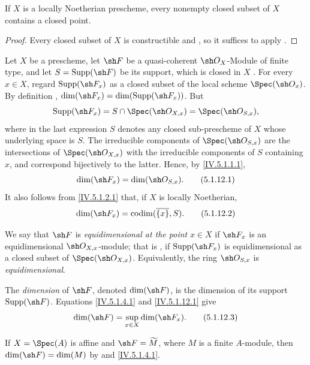 \begin{corollary}[5.1.11]
\label{IV.5.1.11}
If $X$ is a locally Noetherian prescheme, every nonempty closed
subset of $X$ contains a closed point.
\end{corollary}

\begin{proof}
Every closed subset of $X$ is constructible
 and , so it suffices to apply
.
\end{proof}

\begin{env}[5.1.12]
\label{IV.5.1.12}
Let $X$ be a prescheme, let $\sh F$ be a quasi-coherent
$\sh O_X$-Module of finite type, and let
$S=\operatorname{Supp}(\sh F)$ be its support, which is closed in
$X$ .
For every $x\in X$, regard $\operatorname{Supp}(\sh F_x)$ as a closed
subset of the local scheme $\Spec(\sh O_x)$.
By definition , $\dim(\sh F_x)=\dim(\operatorname{Supp}(\sh F_x))$.
But
\[
\operatorname{Supp}(\sh F_x)
  =S\cap\Spec(\sh O_{X,x})
  =\Spec(\sh O_{S,x}),
\]
where in the last expression $S$ denotes any closed sub-prescheme of
$X$ whose underlying space is $S$.
The irreducible components of $\Spec(\sh O_{S,x})$ are the
intersections of $\Spec(\sh O_{X,x})$ with the irreducible components
of $S$ containing $x$, and correspond bijectively to the latter.
Hence, by \eqref{IV.5.1.1.1},
\begin{equation}
\dim(\sh F_x)=\dim(\sh O_{S,x}).
\tag{5.1.12.1}\label{IV.5.1.12.1}
\end{equation}
It also follows from \eqref{IV.5.1.2.1} that, if $X$ is locally
Noetherian,
\begin{equation}
\dim(\sh F_x)=\operatorname{codim}(\overline{\{x\}},S).
\tag{5.1.12.2}\label{IV.5.1.12.2}
\end{equation}

We say that $\sh F$ is \emph{equidimensional at the point} $x\in X$
if $\sh F_x$ is an equidimensional $\sh O_{X,x}$-module; that is
, if $\operatorname{Supp}(\sh F_x)$ is
equidimensional as a closed subset of $\Spec(\sh O_{X,x})$.
Equivalently, the ring $\sh O_{S,x}$ is \emph{equidimensional}.

The \emph{dimension} of $\sh F$, denoted $\dim(\sh F)$, is the
dimension of its support $\operatorname{Supp}(\sh F)$.
Equations \eqref{IV.5.1.4.1} and \eqref{IV.5.1.12.1} give
\begin{equation}
\dim(\sh F)=\sup_{x\in X}\dim(\sh F_x).
\tag{5.1.12.3}\label{IV.5.1.12.3}
\end{equation}

If $X=\Spec(A)$ is affine and $\sh F=\widetilde M$, where $M$ is a
finite $A$-module, then
$\dim(\sh F)=\dim(M)$ by  and
\eqref{IV.5.1.4.1}.
\end{env}

